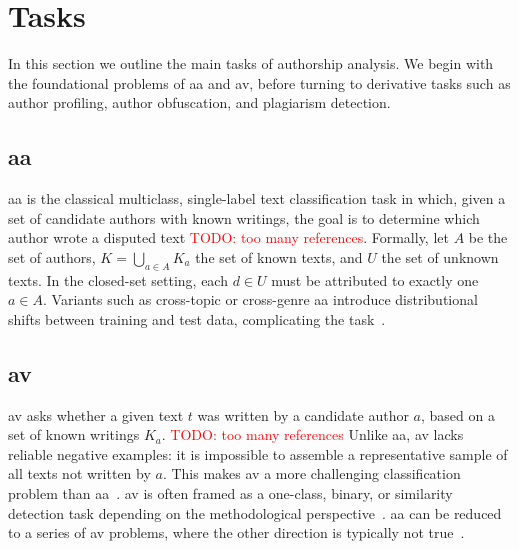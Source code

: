 \section{Tasks}

In this section we outline the main tasks of authorship analysis. 
We begin with the foundational problems of \ac{aa} and \ac{av}, before turning to derivative tasks such as author profiling,  author obfuscation, and plagiarism detection.

\subsection{\acl{aa}}
\ac{aa} is the classical multiclass, single-label text classification task in which, given a set of candidate authors with known writings, the goal is to determine which author wrote a disputed text %
    \textcolor{red}{TODO: too many references}. 
Formally, let $A$ be the set of authors, $K=\bigcup_{a\in A} K_a$ the set of known texts, and $U$ the set of unknown texts. 
In the closed-set setting, each $d \in U$ must be attributed to exactly one $a \in A$. 
Variants such as cross-topic or cross-genre \ac{aa} introduce distributional shifts between training and test data, complicating the task~\citep{barlas_cross_domain_2020}.

\subsection{\acl{av}}
\ac{av} asks whether a given text $t$ was written by a candidate author $a$, based on a set of known writings $K_a$. 
\textcolor{red}{TODO: too many references}
Unlike \ac{aa}, \ac{av} lacks reliable negative examples: it is impossible to assemble a representative sample of all texts not written by $a$. 
This makes \ac{av} a more challenging classification problem than \ac{aa}~\citep{llm_detection_av_2025,neal_surveying_2018,koppel_authorship_2004}.
\ac{av} is often framed as a one-class, binary, or similarity detection task depending on the methodological perspective~\citep{neal_surveying_2018,koppel_authorship_2004}.  
\ac{aa} can be reduced to a series of \ac{av} problems, where the other direction is typically not true~\citep{barlas_cross_domain_2020,tyo_state_2022}.


